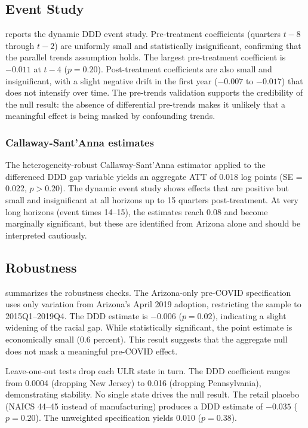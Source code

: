 \documentclass[12pt]{article}
\begin{document}
\subsection{Event Study}



 reports the dynamic DDD event study. Pre-treatment coefficients (quarters $t-8$ through $t-2$) are uniformly small and statistically insignificant, confirming that the parallel trends assumption holds. The largest pre-treatment coefficient is $-0.011$ at $t-4$ ($p = 0.20$). Post-treatment coefficients are also small and insignificant, with a slight negative drift in the first year ($-0.007$ to $-0.017$) that does not intensify over time. The pre-trends validation supports the credibility of the null result: the absence of differential pre-trends makes it unlikely that a meaningful effect is being masked by confounding trends.

\subsubsection*{Callaway-Sant'Anna estimates} The heterogeneity-robust Callaway-Sant'Anna estimator applied to the differenced DDD gap variable yields an aggregate ATT of 0.018 log points (SE = 0.022, $p > 0.20$). The dynamic event study shows effects that are positive but small and insignificant at all horizons up to 15 quarters post-treatment. At very long horizons (event times 14--15), the estimates reach 0.08 and become marginally significant, but these are identified from Arizona alone and should be interpreted cautiously.

\subsection{Robustness}



 summarizes the robustness checks. The Arizona-only pre-COVID specification uses only variation from Arizona's April 2019 adoption, restricting the sample to 2015Q1--2019Q4. The DDD estimate is $-0.006$ ($p = 0.02$), indicating a slight widening of the racial gap. While statistically significant, the point estimate is economically small (0.6 percent). This result suggests that the aggregate null does not mask a meaningful pre-COVID effect.

Leave-one-out tests drop each ULR state in turn. The DDD coefficient ranges from 0.0004 (dropping New Jersey) to 0.016 (dropping Pennsylvania), demonstrating stability. No single state drives the null result. The retail placebo (NAICS 44--45 instead of manufacturing) produces a DDD estimate of $-0.035$ ($p = 0.20$). The unweighted specification yields 0.010 ($p = 0.38$).
\end{document}
